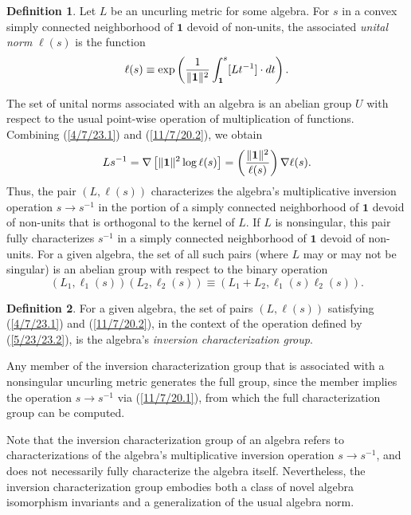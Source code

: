 \documentclass{amsart}
\numberwithin{equation}{section}
\theoremstyle{definition}
\newtheorem{definition}{Definition}[section]
\numberwithin{theorem}{section}
\begin{document}
  
  
  \begin{definition} Let $L$ be an uncurling metric for some algebra.  For $s$ in a convex simply connected neighborhood of $\mathbf{1}$ devoid of non-units, the associated {\it unital norm} $ \ell(s)$ is the function
  \begin{equation}\label{11/7/20.2}   \ell(s) \equiv \exp\left({\frac{1}{\|{\bf 1}\|^2}\int_{\bf 1}^s [Lt^{-1}]\cdot dt}\right).\end{equation}\end{definition}  
  
   \bigskip
   
  The set of unital norms associated with an algebra is an abelian group $ U$ with respect to the usual point-wise operation of multiplication of functions.  Combining (\ref{4/7/23.1}) and (\ref{11/7/20.2}), we obtain  \begin{equation}\label{11/7/20.1} Ls^{-1}  = \nabla\left[\|{\bf 1}\|^2\log  \ell(s)\right] =   \left(\frac{\|{\bf 1}\|^2}{ \ell(s)}\right)\nabla \ell(s).\end{equation} 
Thus, the pair $(L, \ell(s))$ characterizes the algebra's multiplicative inversion operation $s\rightarrow s^{-1}$ in the portion of a simply connected neighborhood of $\mathbf{1}$ devoid of non-units that is orthogonal to the kernel of $L$.  If $L$ is nonsingular, this pair fully characterizes $s^{-1}$ in a simply connected neighborhood of $\mathbf{1}$ devoid of non-units.  For a given algebra, the set of all such pairs (where $L$ may or may not be singular) is an abelian group with respect to the binary operation 
\begin{equation}\label{5/23/23.2} (L_1, \ell_1(s))(L_2, \ell_2(s)) \equiv 
\left(L_1+L_2, \ell_1(s)  \ell_2(s)\right).\end{equation} 
\begin{definition} For a given algebra, the set of pairs $(L, \ell(s))$ satisfying (\ref{4/7/23.1}) and (\ref{11/7/20.2}), in the context of the operation defined by (\ref{5/23/23.2}), is the algebra's {\it inversion characterization group}. \end{definition}

Any member of the inversion characterization group that is associated with a nonsingular uncurling metric generates the full group, since the member implies the operation $s\rightarrow s^{-1}$ via (\ref{11/7/20.1}), from which the full characterization group can be computed.

Note that the inversion characterization group of an algebra refers to characterizations of the algebra's multiplicative inversion operation $s\rightarrow s^{-1}$, and does not necessarily fully characterize the algebra itself.  
Nevertheless,  the inversion characterization group embodies both a class of  novel algebra isomorphism invariants and a generalization of the usual algebra norm.  
\end{document}
